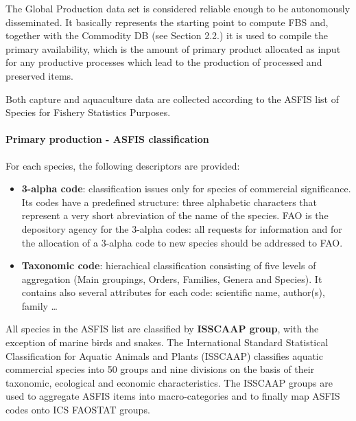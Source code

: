 \documentclass[nojss]{jss}
\begin{document}
The Global Production data set is considered reliable enough to be autonomously disseminated. It basically represents the starting point to compute FBS and, together with the Commodity DB (see Section 2.2.) it is used to compile the primary availability, which is the amount of primary product allocated as input for any productive processes which lead to the production of processed and preserved items.

Both capture and aquaculture data are collected according to the ASFIS list of Species for Fishery Statistics Purposes. 

\paragraph{Primary production - ASFIS classification}

For each species, the following descriptors are provided: 

\begin{itemize}
\item \textbf{3-alpha code}: classification issues only for species of commercial significance. Its codes have a predefined structure: three alphabetic characters that represent a very short abreviation of the name of the species. FAO is the depository agency for the 3-alpha codes: all requests for information and for the allocation of a 3-alpha code to new species should be addressed to FAO. 


\item \textbf{Taxonomic code}: hierachical classification consisting of five levels of aggregation (Main groupings, Orders, Families, Genera and Species). It contains also several attributes for each code: scientific name, author(s), family \dots
\end{itemize}

All species in the ASFIS list are classified by \textbf{ISSCAAP group}, with the exception of marine birds and snakes. The International Standard Statistical Classification for Aquatic Animals and Plants (ISSCAAP) classifies aquatic commercial species into 50 groups and nine divisions on the basis of their taxonomic, ecological and economic characteristics. The ISSCAAP groups are used to aggregate ASFIS items into macro-categories and to finally map ASFIS codes onto ICS FAOSTAT groups.
\end{document}
